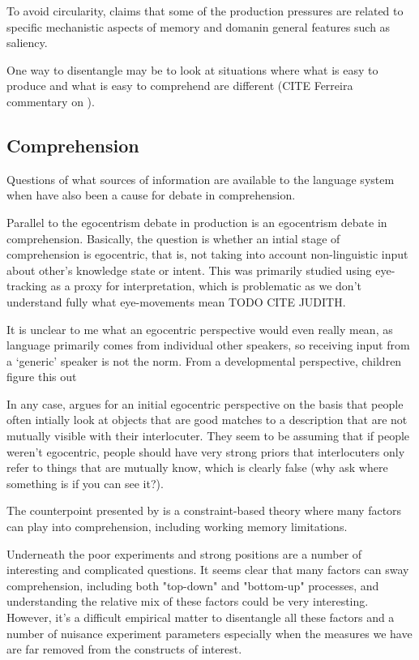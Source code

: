 \documentclass[]{article}
\begin{document}
To avoid circularity, \cite{macdonald2013} claims that some of the production pressures are related to specific mechanistic aspects of memory and domanin general features such as saliency. %

One way to disentangle may be to look at situations where what is easy to produce and what is easy to comprehend are different (CITE Ferreira commentary on \cite{pickering2004}). 


\subsection{Comprehension}

Questions of what sources of information are available to the language system when have also been a cause for debate in comprehension. 

Parallel to the egocentrism debate in production is an egocentrism debate in comprehension. Basically, the question is whether an intial stage of comprehension is egocentric, that is, not taking into account non-linguistic input about other's knowledge state or intent. This was primarily studied using eye-tracking as a proxy for interpretation, which is problematic as we don't understand fully what eye-movements mean TODO CITE JUDITH. 

It is unclear to me what an egocentric perspective would even really mean, as language primarily comes from individual other speakers, so receiving input from a `generic' speaker is not the norm. From a developmental perspective, children figure this out %

In any case, \cite{keysar2000} argues for an initial egocentric perspective on the basis that people often intially look at objects that are good matches to a description that are not mutually visible with their interlocuter. They seem to be assuming that if people weren't egocentric, people should have very strong priors that interlocuters only refer to things that are mutually know, which is clearly false (why ask where something is if you can see it?). 

The counterpoint presented by \cite{hanna2003} is a constraint-based theory where many factors can play into comprehension, including working memory limitations. 

Underneath the poor experiments and strong positions are a number of interesting and complicated questions. It seems clear that many factors can sway comprehension, including both "top-down" and "bottom-up" processes, and understanding the relative mix of these factors could be very interesting. However, it's a difficult empirical matter to disentangle all these factors and a number of nuisance experiment parameters especially when the measures we have are far removed from the constructs of interest. 
\end{document}
